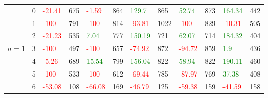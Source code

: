 \begin{table}[!htb]
\begin{adjustwidth}{-0.8in}{-0.9in}
\begin{tabular}{|p{4em}|p{2em}|p{3em}|p{3em}|p{3em}|p{3em}|p{3em}|p{3em}|p{3em}|p{3em}|p{3em}|p{3em}|}
            & 0 & \textcolor{red}{-21.41} & 675 & \textcolor{red}{-1.59} & 864 & \textcolor{green}{129.7} & 865 & \textcolor{green}{52.74} & 873 & \textcolor{green}{164.34} & 442\\\cline{3-12}
            & 1 & \textcolor{red}{-100} & 791 & \textcolor{red}{-100} & 814 & \textcolor{red}{-93.81} & 1022 & \textcolor{red}{-100} & 829 & \textcolor{red}{-10.31} & 505\\\cline{3-12}
            & 2 & \textcolor{red}{-21.23} & 535 & \textcolor{green}{7.04} & 777 & \textcolor{green}{150.19} & 721 & \textcolor{green}{62.07} & 714 & \textcolor{green}{184.32} & 404\\\cline{3-12}
            $\sigma=1$& 3 & \textcolor{red}{-100} & 497 & \textcolor{red}{-100} & 657 & \textcolor{red}{-74.92} & 872 & \textcolor{red}{-94.72} & 859 & \textcolor{green}{1.9} & 436\\\cline{3-12}
            & 4 & \textcolor{red}{-5.26} & 689 & \textcolor{green}{15.54} & 799 & \textcolor{green}{156.04} & 822 & \textcolor{green}{58.94} & 822 & \textcolor{green}{190.11} & 460\\\cline{3-12}
            & 5 & \textcolor{red}{-100} & 533 & \textcolor{red}{-100} & 612 & \textcolor{red}{-69.44} & 785 & \textcolor{red}{-87.97} & 769 & \textcolor{green}{37.38} & 408\\\cline{3-12}
            & 6 & \textcolor{red}{-53.08} & 108 & \textcolor{red}{-66.08} & 169 & \textcolor{red}{-46.79} & 125 & \textcolor{red}{-59.38} & 159 & \textcolor{red}{-41.59} & 158\\\hline\hline
            

\end{tabular}
\end{adjustwidth}
\end{table}
